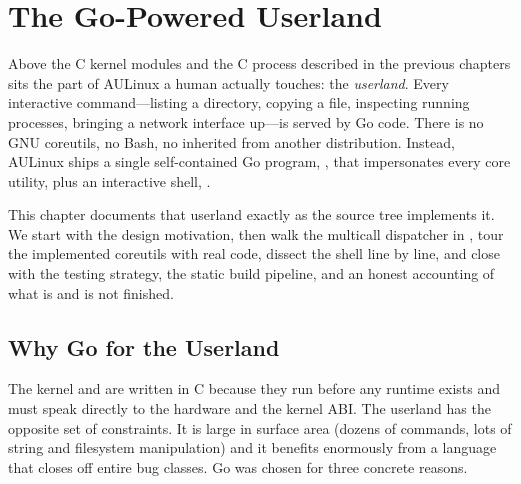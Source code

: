 \chapter{The Go-Powered Userland}
\label{chap:userland}

Above the C kernel modules and the C  process described in the
previous chapters sits the part of AULinux a human actually touches: the
\emph{userland}. Every interactive command---listing a directory, copying a
file, inspecting running processes, bringing a network interface up---is served
by Go code. There is no GNU coreutils, no Bash, no  inherited from
another distribution. Instead, AULinux ships a single self-contained Go program,
, that impersonates every core utility, plus an interactive shell,
.

This chapter documents that userland exactly as the source tree implements it.
We start with the design motivation, then walk the multicall dispatcher in
, tour the implemented coreutils with real code, dissect the
 shell line by line, and close with the testing strategy, the static
build pipeline, and an honest accounting of what is and is not finished.

\section{Why Go for the Userland}

The kernel and  are written in C because they run before any
runtime exists and must speak directly to the hardware and the kernel ABI. The
userland has the opposite set of constraints. It is large in surface area
(dozens of commands, lots of string and filesystem manipulation) and it benefits
enormously from a language that closes off entire bug classes. Go was chosen for
three concrete reasons.

